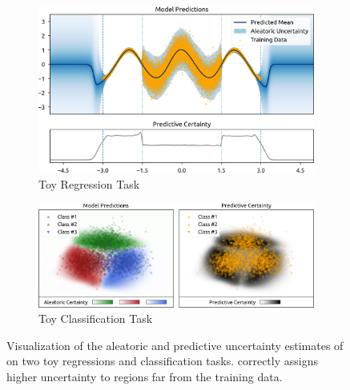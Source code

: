 \begin{figure}
    \centering
    \begin{subfigure}[t]{0.45 \textwidth}
        \centering
        \includegraphics[width=0.9 \textwidth]{sections/007_iclr2022/resources/toy-regression-trimmed.png}
        \caption{Toy Regression Task}
    \end{subfigure}%
    \begin{subfigure}[t]{0.45 \textwidth}
        \centering
        \includegraphics[width=0.95 \textwidth]{sections/007_iclr2022/resources/toy-classification-trimmed.png}
        \caption{Toy Classification Task}
    \end{subfigure}%

    \caption{Visualization of the aleatoric and predictive uncertainty estimates of \NatPNacro{} on two toy regressions and classification tasks. \NatPNacro{} correctly assigns higher uncertainty to regions far from the training data.}
    \label{fig:toy-example-uncertainty}
\end{figure}

